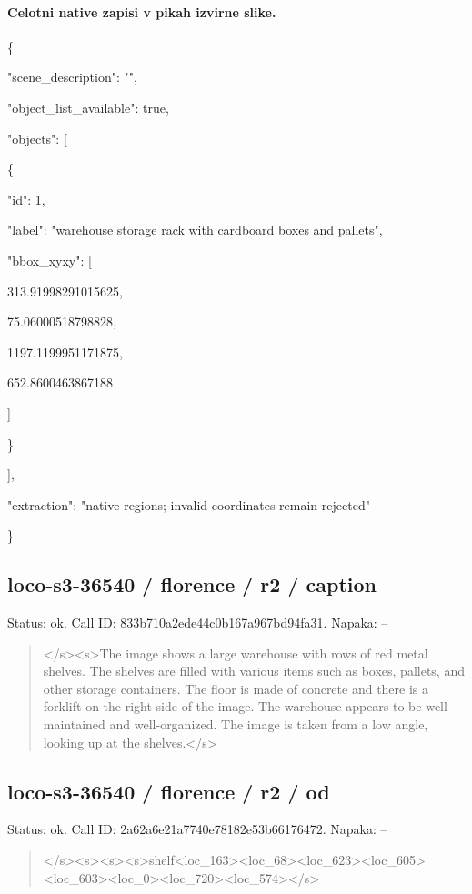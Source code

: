 \documentclass[10pt,a4paper]{article}
\begin{document}
\paragraph{Celotni native zapisi v pikah izvirne slike.}
\{\par
  "scene\_description":\allowbreak{} "",\allowbreak{}\par
  "object\_list\_available":\allowbreak{} true,\allowbreak{}\par
  "objects":\allowbreak{} [\par
    \{\par
      "id":\allowbreak{} 1,\allowbreak{}\par
      "label":\allowbreak{} "warehouse storage rack with cardboard boxes and pallets",\allowbreak{}\par
      "bbox\_xyxy":\allowbreak{} [\par
        313.91998291015625,\allowbreak{}\par
        75.06000518798828,\allowbreak{}\par
        1197.1199951171875,\allowbreak{}\par
        652.8600463867188\par
      ]\par
    \}\par
  ],\allowbreak{}\par
  "extraction":\allowbreak{} "native regions; invalid coordinates remain rejected"\par
\}
\subsection*{loco-s3-36540 / florence / r2 / caption}
Status: ok. Call ID: 833b710a2ede44c0b167a967bd94fa31. Napaka: --
\begin{quote}\footnotesize
</s>\allowbreak{}<s>\allowbreak{}The image shows a large warehouse with rows of red metal shelves. The shelves are filled with various items such as boxes,\allowbreak{} pallets,\allowbreak{} and other storage containers. The floor is made of concrete and there is a forklift on the right side of the image. The warehouse appears to be well-maintained and well-organized. The image is taken from a low angle,\allowbreak{} looking up at the shelves.</s>\allowbreak{}
\end{quote}
\subsection*{loco-s3-36540 / florence / r2 / od}
Status: ok. Call ID: 2a62a6e21a7740e78182e53b66176472. Napaka: --
\begin{quote}\footnotesize
</s>\allowbreak{}<s>\allowbreak{}<s>\allowbreak{}<s>\allowbreak{}shelf<loc\_163>\allowbreak{}<loc\_\allowbreak{}68>\allowbreak{}<loc\_623>\allowbreak{}<loc\_605>\allowbreak{}<loc\_603>\allowbreak{}<l\allowbreak{}oc\_0>\allowbreak{}<loc\_720>\allowbreak{}<loc\_574>\allowbreak{}</s>\allowbreak{}
\end{quote}
\end{document}
